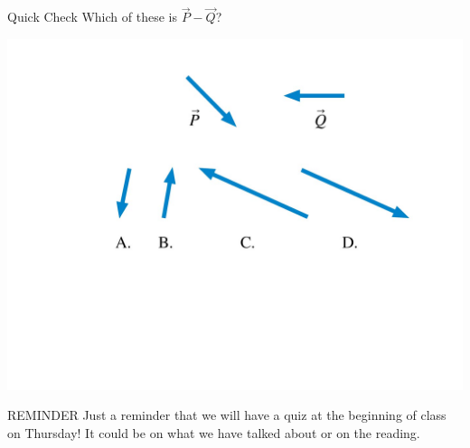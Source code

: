 \documentclass{beamer}
\newcommand{\red}[1]{{\color{red}{#1}}}
\newcommand{\checkH}[2]{\begin{textblock*}{1cm}(#1,#2){\Huge \red{\Checkmark}}\end{textblock*}}
\begin{document}
\begin{frame}{Quick Check}
Which of these is $\vec{P}-\vec{Q}$?
\begin{center}
   \includegraphics[width=1\textwidth]{../figures/QC1_3.jpg}
\end{center}
\only<2>{\checkH{9cm}{6.2cm}}
\end{frame}

\begin{frame}{REMINDER}
Just a reminder that we will have a quiz at the beginning of class on Thursday! It could be on what we have talked about or on the reading.
\end{frame}
\end{document}
